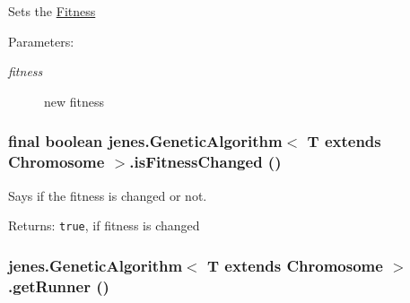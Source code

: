 Sets the \hyperlink{}{Fitness}

\begin{Desc}
\item[Parameters:]
\begin{description}
\item[{\em fitness}]new fitness \end{description}
\end{Desc}
\hypertarget{classjenes_1_1_genetic_algorithm_3_01_t_01extends_01_chromosome_01_4_7d5cb4716cbc586aa85774c5dc934d15}{
\subsubsection[isFitnessChanged]{\setlength{\rightskip}{0pt plus 5cm}final boolean jenes.GeneticAlgorithm$<$ T extends Chromosome $>$.isFitnessChanged ()}}
\label{classjenes_1_1_genetic_algorithm_3_01_t_01extends_01_chromosome_01_4_7d5cb4716cbc586aa85774c5dc934d15}


Says if the fitness is changed or not. \begin{Desc}
\item[Returns:]{\tt true}, if fitness is changed \end{Desc}
\hypertarget{classjenes_1_1_genetic_algorithm_3_01_t_01extends_01_chromosome_01_4_63ea13380fe4a30d1eabd394e44d6e96}{
\subsubsection[getRunner]{ jenes.GeneticAlgorithm$<$ T extends Chromosome $>$.getRunner ()}}
\label{classjenes_1_1_genetic_algorithm_3_01_t_01extends_01_chromosome_01_4_63ea13380fe4a30d1eabd394e44d6e96}



